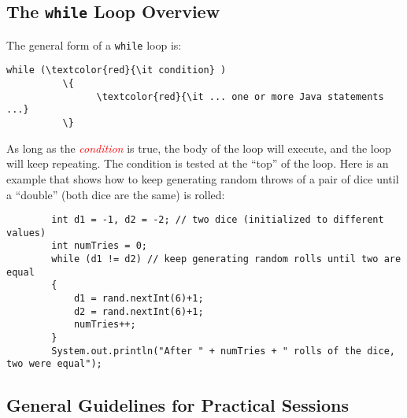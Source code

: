 \vspace{-0.1in}
\subsection*{The {\tt while} Loop Overview}
\vspace*{-.05in}

The general form of a {\tt while} loop is:

\begin{Verbatim}[commandchars=\\\{\}]
          while (\textcolor{red}{\it condition} )
          \{
                \textcolor{red}{\it ... one or more Java statements ...}
          \}
          \end{Verbatim}

          \vspace{-0.15in}

          As long as the \textcolor{red}{\it condition} is true, the body of the loop will execute, and the loop will
          keep repeating. The condition is tested at the ``top'' of the loop.  Here is an example that shows how to keep
          generating random throws of a pair of dice until a ``double'' (both dice are the same) is rolled:

          \vspace{-0.125in}

          \begin{verbatim}
        int d1 = -1, d2 = -2; // two dice (initialized to different values)
        int numTries = 0;
        while (d1 != d2) // keep generating random rolls until two are equal
        {
            d1 = rand.nextInt(6)+1;
            d2 = rand.nextInt(6)+1;
            numTries++;
        }
        System.out.println("After " + numTries + " rolls of the dice, two were equal");
          \end{verbatim}

          \vspace*{-.275in}
          \subsection*{General Guidelines for Practical Sessions}
          \vspace*{-.05in}

